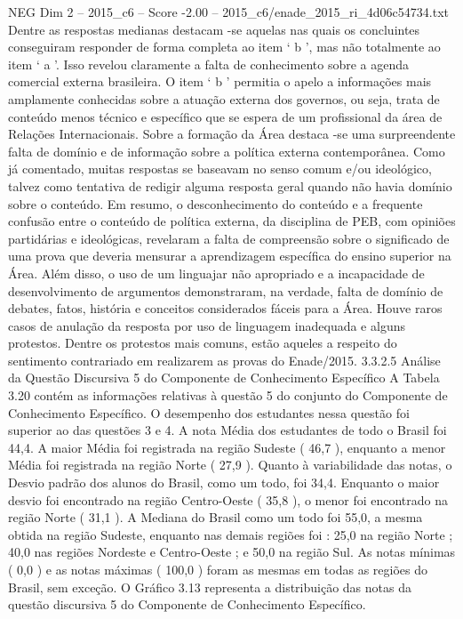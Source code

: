 \begin{textsample}{NEG Dim 2 – 2015\_c6 – Score -2.00 – 2015\_c6/enade\_2015\_ri\_4d06c54734.txt}
Dentre as respostas medianas destacam -se aquelas nas quais os concluintes conseguiram responder de forma completa ao item ‘ b ’, mas não totalmente ao item ‘ a ’.
Isso revelou claramente a falta de conhecimento sobre a agenda comercial externa brasileira.
O item ‘ b ’ permitia o apelo a informações mais amplamente conhecidas sobre a atuação externa dos governos, ou seja, trata de conteúdo menos técnico e específico que se espera de um profissional da área de Relações Internacionais.
Sobre a formação da Área destaca -se uma surpreendente falta de domínio e de informação sobre a política externa contemporânea.
Como já comentado, muitas respostas se baseavam no senso comum e/ou ideológico, talvez como tentativa de redigir alguma resposta geral quando não havia domínio sobre o conteúdo.
Em resumo, o desconhecimento do conteúdo e a frequente confusão entre o conteúdo de política externa, da disciplina de PEB, com opiniões partidárias e ideológicas, revelaram a falta de compreensão sobre o significado de uma prova que deveria mensurar a aprendizagem específica do ensino superior na Área.
Além disso, o uso de um linguajar não apropriado e a incapacidade de desenvolvimento de argumentos demonstraram, na verdade, falta de domínio de debates, fatos, história e conceitos considerados fáceis para a Área.
Houve raros casos de anulação da resposta por uso de linguagem inadequada e alguns protestos.
Dentre os protestos mais comuns, estão aqueles a respeito do sentimento contrariado em realizarem as provas do Enade/2015. 3.3.2.5 Análise da Questão Discursiva 5 do Componente de Conhecimento Específico A Tabela 3.20 contém as informações relativas à questão 5 do conjunto do Componente de Conhecimento Específico.
O desempenho dos estudantes nessa questão foi superior ao das questões 3 e 4.
A nota Média dos estudantes de todo o Brasil foi 44,4.
A maior Média foi registrada na região Sudeste ( 46,7 ), enquanto a menor Média foi registrada na região Norte ( 27,9 ).
Quanto à variabilidade das notas, o Desvio padrão dos alunos do Brasil, como um todo, foi 34,4.
Enquanto o maior desvio foi encontrado na região Centro-Oeste ( 35,8 ), o menor foi encontrado na região Norte ( 31,1 ).
A Mediana do Brasil como um todo foi 55,0, a mesma obtida na região Sudeste, enquanto nas demais regiões foi : 25,0 na região Norte ; 40,0 nas regiões Nordeste e Centro-Oeste ; e 50,0 na região Sul.
As notas mínimas ( 0,0 ) e as notas máximas ( 100,0 ) foram as mesmas em todas as regiões do Brasil, sem exceção.
O Gráfico 3.13 representa a distribuição das notas da questão discursiva 5 do Componente de Conhecimento Específico.

\end{textsample}
